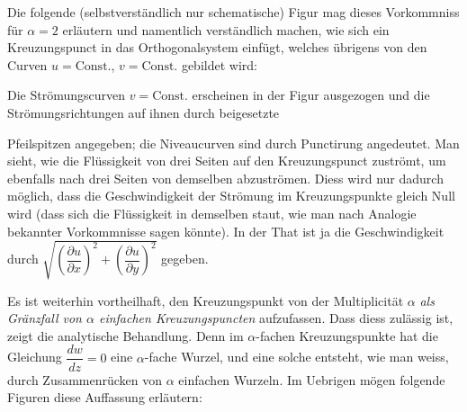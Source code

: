 \documentclass{article}
\begin{document}
Die folgende (selbstverständlich nur schematische) Figur mag dieses Vorkommniss für $\alpha = 2$ erläutern und namentlich verständlich machen, wie sich ein Kreuzungspunct in das Orthogonalsystem einfügt, welches übrigens von den Curven $u = \text{Const.}$, $v = \text{Const.}$ gebildet wird:


Die Strömungscurven $v = \text{Const.}$ erscheinen in der Figur ausgezogen und die Strömungsrichtungen auf ihnen durch beigesetzte

Pfeilspitzen angegeben; die Niveaucurven sind durch Punctirung angedeutet. Man sieht, wie die Flüssigkeit von drei Seiten auf den Kreuzungspunct zuströmt, um ebenfalls nach drei Seiten von demselben abzuströmen. Diess wird nur dadurch möglich, dass die Geschwindigkeit der Strömung im Kreuzungspunkte gleich Null wird (dass sich die Flüssigkeit in demselben staut, wie man nach Analogie bekannter Vorkommnisse sagen könnte). In der That ist ja die Geschwindigkeit durch $\sqrt{\left(\dfrac{\partial u}{\partial x}\right)^{2} + \left(\dfrac{\partial u}{\partial y}\right)^{2}}$ gegeben.

Es ist weiterhin vortheilhaft, den Kreuzungspunkt von der Multiplicität $\alpha$ \emph{als Gränzfall von $\alpha$ einfachen Kreuzungspuncten} aufzufassen. Dass diess zulässig ist, zeigt die analytische Behandlung. Denn im $\alpha$-fachen Kreuzungspunkte hat die Gleichung $\dfrac{dw}{dz} = 0$ eine $\alpha$-fache Wurzel, und eine solche entsteht, wie man weiss, durch Zusammenrücken von $\alpha$ einfachen Wurzeln. Im Uebrigen mögen folgende Figuren diese Auffassung erläutern:

\end{document}
